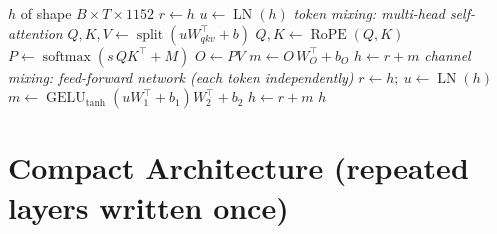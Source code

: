 \documentclass[10pt,a4paper]{article}
\newcommand{\op}[1]{\operatorname{#1}}
\theoremstyle{definition}
\begin{document}
\begin{algorithm}[H]
\caption{Block $\mathcal{B}_{\mathrm{V}}(h)$ --- Vision encoder block}
\begin{algorithmic}[1]
\Require $h$ of shape $B\times T\times 1152$
\State $r \gets h$ 
\State $u \gets \op{LN}(h)$ 
\Statex \hspace{-1.2em}\textit{token mixing: multi-head self-attention}
\State $Q,K,V \gets \op{split}(u W_{qkv}^{\top} + b)$ 
\State $Q, K \gets \op{RoPE}(Q, K)$ 
\State $P \gets \op{softmax}(s\, Q K^{\top} + M)$ 
\State $O \gets P V$ 
\State $m \gets O\, W_O^{\top} + b_O$ 
\State $h \gets r + m$ 
\Statex \hspace{-1.2em}\textit{channel mixing: feed-forward network (each token independently)}
\State $r \gets h;\ u \gets \op{LN}(h)$
\State $m \gets \op{GELU}_{\tanh}(u W_1^{\top} + b_1) W_2^{\top} + b_2$ 
\State $h \gets r + m$ 
\State \Return $h$
\end{algorithmic}
\end{algorithm}
\section{Compact Architecture (repeated layers written once)}\label{sec:compact}
\end{document}

